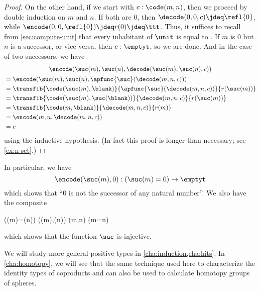 \begin{proof}
  On the other hand, if we start with $c:\code(m,n)$, then we proceed by double induction on $m$ and $n$.
  If both are $0$, then $\decode(0,0,c) \jdeq \refl{0}$, while $\encode(0,0,\refl{0})\jdeq r(0) \jdeq \ttt$.
  Thus, it suffices to recall from \cref{sec:compute-unit} that every inhabitant of $\unit$ is equal to \ttt.
  If $m$ is $0$ but $n$ is a successor, or vice versa, then $c:\emptyt$, so we are done.
  And in the case of two successors, we have
  \begin{multline*}
    \encode(\suc(m),\suc(n),\decode(\suc(m),\suc(n),c))\\
    \begin{aligned}
    &= \encode(\suc(m),\suc(n),\apfunc{\suc}(\decode(m,n,c)))\\
    &= \transfib{\code(\suc(m),{\blank})}{\apfunc{\suc}(\decode(m,n,c))}{r(\suc(m))}\\
    &= \transfib{\code(\suc(m),\suc({\blank}))}{\decode(m,n,c)}{r(\suc(m))}\\
    &= \transfib{\code(m,{\blank})}{\decode(m,n,c)}{r(m)}\\
    &= \encode(m,n,\decode(m,n,c))\\
    &= c
  \end{aligned}
  \end{multline*}
  using the inductive hypothesis.
  (In fact this proof is longer than necessary; see \cref{ex:n-set}.)
\end{proof}

In particular, we have
\begin{equation}\label{eq:zero-not-succ}
  \encode(\suc(m),0) : (\suc(m)=0) \to \emptyt
\end{equation}
which shows that ``$0$ is not the successor of any natural number''.
We also have the composite
\begin{narrowmultline}\label{eq:suc-injective}
  (\suc(m)=\suc(n))
  \xrightarrow{\encode} \narrowbreak
  \code(\suc(m),\suc(n))
  \jdeq \code(m,n) \xrightarrow{\decode} (m=n)
\end{narrowmultline}
which shows that the function $\suc$ is injective.
%

We will study more general positive types in \cref{cha:induction,cha:hits}.
In \cref{cha:homotopy}, we will see that the same technique used here to characterize the identity types of coproducts and \nat can also be used to calculate homotopy groups of spheres.

%
%

